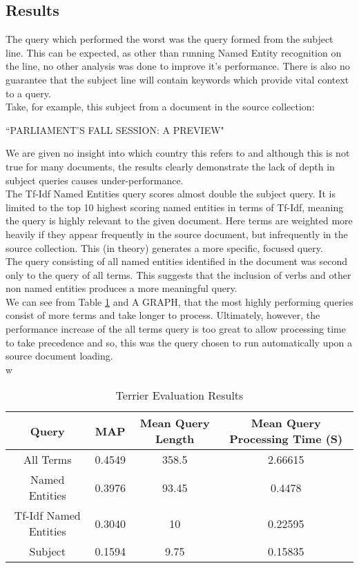 \documentclass{l4proj}
\begin{document}
\subsection{Results}

The query which performed the worst was the query formed from the subject line. This can be expected, as other than running Named Entity recognition on the line, no other analysis was done to improve it's performance. There is also no guarantee that the subject line will contain keywords which provide vital context to a query.\\
Take, for example, this subject from a document in the source collection:
\begin{center}
``PARLIAMENT'S FALL SESSION: A PREVIEW"
\end{center}
We are given no insight into which country this refers to and although this is not true for many documents, the results clearly demonstrate the lack of depth in subject queries causes under-performance.\\
The Tf-Idf Named Entities query scores almost double the subject query. It is limited to the top 10 highest scoring named entities in terms of Tf-Idf, meaning the query is highly relevant to the given document. Here terms are weighted more heavily if they appear frequently in the source document, but infrequently in the source collection. This (in theory) generates a more specific, focused query. \\
The query consisting of all named entities identified in the document was second only to the query of all terms. This suggests that the inclusion of verbs and other non named entities produces a more meaningful query.\\
We can see from Table \ref{results} and A GRAPH, that the most highly performing queries consist of more terms and take longer to process. Ultimately, however, the performance increase of the all terms query is too great to allow processing time to take precedence and so, this was the query chosen to run automatically upon a source document loading.\\w
\begin{center}
\begin{table}
\centering
\begin{tabular}{|c|c|c|c|}
\hline
Query                 & MAP    & Mean Query Length & Mean Query Processing Time (S) \\ \hline
All Terms             & 0.4549 & 358.5             & 2.66615                        \\ \hline
Named Entities        & 0.3976 & 93.45             & 0.4478                         \\ \hline
Tf-Idf Named Entities & 0.3040 & 10                & 0.22595                        \\ \hline
Subject               & 0.1594 & 9.75              & 0.15835                        \\ \hline
\end{tabular}
\caption{Terrier Evaluation Results}
\label{results}
\end{table}
\end{center}
\end{document}
